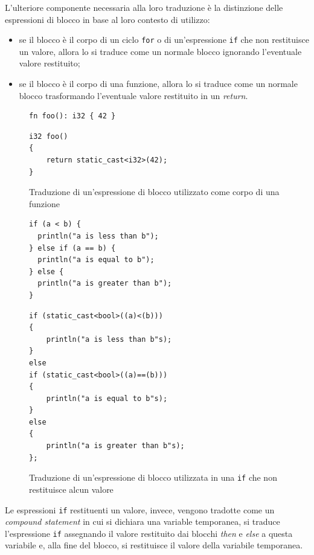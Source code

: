L'ulteriore componente necessaria alla loro traduzione \`e la distinzione delle espressioni di blocco in base al loro contesto di utilizzo:
\begin{itemize}
	\item se il blocco \`e il corpo di un ciclo \texttt{for} o di un'espressione \texttt{if} che non restituisce un valore, allora lo si traduce come un normale blocco ignorando l'eventuale valore restituito;
	\item se il blocco \`e il corpo di una funzione, allora lo si traduce come un normale blocco trasformando l'eventuale valore restituito in un \textit{return}.
\end{itemize}

\begin{figure}[H]
	\centering
	\begin{verbatim}
fn foo(): i32 { 42 }
	\end{verbatim}
	\begin{verbatim}
i32 foo()
{
    return static_cast<i32>(42);
}
	\end{verbatim}
	\caption{Traduzione di un'espressione di blocco utilizzato come corpo di una funzione}
	\label{fig:block-expr-as-function-body}
\end{figure}

\begin{figure}[H]
	\centering
	\begin{verbatim}
if (a < b) {
  println("a is less than b");
} else if (a == b) {
  println("a is equal to b");
} else {
  println("a is greater than b");
}
	\end{verbatim}
	\begin{verbatim}
if (static_cast<bool>((a)<(b)))
{
    println("a is less than b"s);
}
else
if (static_cast<bool>((a)==(b)))
{
    println("a is equal to b"s);
}
else
{
    println("a is greater than b"s);
};
	\end{verbatim}
	\caption{Traduzione di un'espressione di blocco utilizzata in una \texttt{if} che non restituisce alcun valore}
	\label{fig:block-expr-as-if-with-no-value}
\end{figure}

Le espressioni \texttt{if} restituenti un valore, invece, vengono tradotte come un \textit{compound statement} in cui si dichiara una variable temporanea, si traduce l'espressione \texttt{if} assegnando il valore restituito dai blocchi \textit{then} e \textit{else} a questa variabile e, alla fine del blocco, si restituisce il valore della variabile temporanea.

